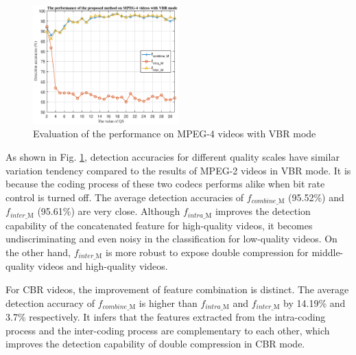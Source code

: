 \documentclass[journal,sort]{IEEEtran}
\begin{document}
\begin{figure}[htbp!]
	\centering
	\includegraphics[width=0.5\textwidth]{MPEG4-VBR.eps}
	\caption{Evaluation of the performance on MPEG-4 videos with VBR mode}
	\label{mpeg4-vbr}
\end{figure}



As shown in Fig. \ref{mpeg4-vbr}, detection accuracies for different quality scales have similar variation tendency compared to the results of MPEG-2 videos in VBR mode. It is because the coding process of these two codecs performs alike when bit rate control is turned off. The average detection accuracies of $f_{combine\_\text{M}}$ (95.52\%) and $f_{inter\_\text{M}}$ (95.61\%) are very close. Although $f_{intra\_\text{M}}$ improves the detection capability of the concatenated feature for high-quality videos, it becomes undiscriminating and even noisy in the classification for low-quality videos. On the other hand, $f_{inter\_\text{M}}$ is more robust to expose double compression for middle-quality videos and high-quality videos. 

For CBR videos, the improvement of feature combination is distinct. The average detection accuracy of $f_{combine\_\text{M}}$ is higher than $f_{intra\_\text{M}}$ and $f_{inter\_\text{M}}$ by 14.19\% and 3.7\% respectively. It infers that the features extracted from the intra-coding process and the inter-coding process are complementary to each other, which improves the detection capability of double compression in CBR mode.
\end{document}
